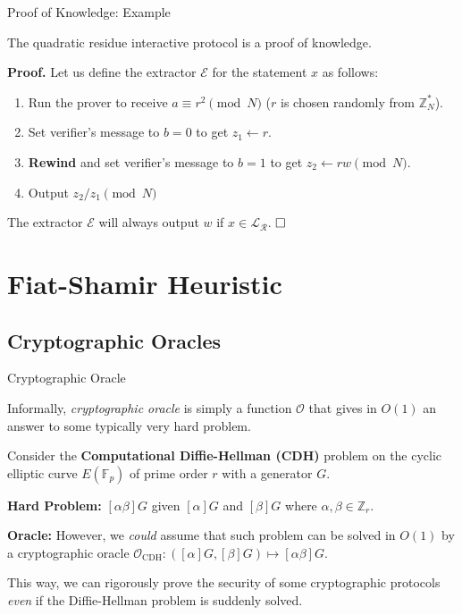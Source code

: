 \documentclass[xcolor={usenames,dvipsnames}]{beamer}
\begin{document}
    \begin{frame}{Proof of Knowledge: Example}
        \begin{lemma}
            The quadratic residue interactive protocol is a proof of knowledge.
        \end{lemma}
        
        \textbf{Proof.} Let us define the extractor $\mathcal{E}$ for the statement $x$ as follows:
        \begin{enumerate}
            \item Run the prover to receive $a \equiv r^2 \pmod{N}$ ($r$ is chosen randomly from $\mathbb{Z}_N^*$).
            \item Set verifier's message to $b=0$ to get $z_1 \gets r$.
            \item \textbf{Rewind} and set verifier's message to $b=1$ to get $z_2 \gets rw \pmod{N}$.
            \item Output $z_2/z_1 \pmod{N}$
        \end{enumerate}
        
        The extractor $\mathcal{E}$ will always output $w$ if $x \in \mathcal{L}_{\mathcal{R}}$. $\hfill\Box$
    \end{frame}

    \section{Fiat-Shamir Heuristic}
    \subsection{Cryptographic Oracles}
    \begin{frame}{Cryptographic Oracle}
        \begin{definition}
            Informally, \textit{cryptographic oracle} is simply a function $\mathcal{O}$ that gives in $O(1)$ an answer to some typically very hard problem.     
        \end{definition}
        
        \begin{example}
            Consider the \textbf{Computational Diffie-Hellman (CDH)} problem on the cyclic elliptic curve $E(\mathbb{F}_p)$ of prime order $r$ with a generator $G$. 
            
            \textbf{Hard Problem:} $[\alpha\beta]G$ given $[\alpha]G$ and $[\beta]G$ where $\alpha,\beta \in \mathbb{Z}_r$. 
        
            \textbf{Oracle:} However, we \textit{could} assume that such problem can be solved in $O(1)$ by a cryptographic oracle $\mathcal{O}_{\text{CDH}}: ([\alpha]G,[\beta]G) \mapsto [\alpha\beta]G$. 
            
            This way, we can rigorously prove the security of some cryptographic protocols \textit{even} if the Diffie-Hellman problem is suddenly solved. 
        \end{example}
    \end{frame}
\end{document}
